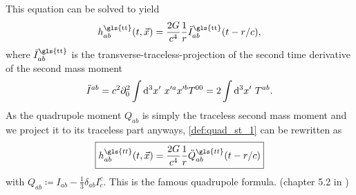 This equation can be solved to yield
\begin{equation}
h_{ab}^\text{\gls{tt}}\lr{t,\vec{x}}=\frac{2 G}{c^4}\frac{1}{r}\ddot{I}_{ab}^\text{\gls{tt}}\lr{t-r/c},
\end{equation}
where $\ddot{I}_{ab}^\text{\gls{tt}}$ is the transverse-traceless-projection of the second time derivative of the second mass moment
\begin{equation}\label{def:quad_st_1}
\ddot{I}^{ab}=c^2\partial_0^2 \int\mathop{}\!\mathrm{d^3}x'\ x'^a x'^b T^{00} = 2\int\mathop{}\!\mathrm{d^3}x'\ T^{ab}.
\end{equation}
As the quadrupole moment $Q_{ab}$ is simply the traceless second mass moment and we project it to its traceless part anyways, \eqref{def:quad_st_1} can be rewritten as
\begin{equation}\label{def:h_quadrupole}
\boxed{h^{\gls{tt}}_{ab}\lr{t,\vec{x}} = \frac{2 G}{c^4}\frac{1}{r}\ddot{Q}^{\gls{tt}}_{ab}\lr{t-r/c}}
\end{equation}
with $Q_{ab}\coloneqq I_{ab} - \frac{1}{3}\delta_{ab}I^c_c$. This is the famous quadrupole formula. (chapter 5.2 in \cite{bachelor})\medskip\\

